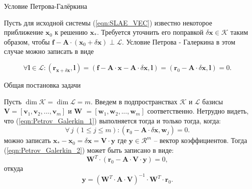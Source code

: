 \documentclass[10pt,xcolor=pst,aspectratio=169]{beamer}
\begin{document}
\begin{frame}{Условие Петрова-Галёркина}

	\transdissolve[duration=0.2]
	\justifying
	\large
	Пусть для исходной системы (\ref{eqn:SLAE_VEC}) известно некоторое приближение $\textbf{x}_{0}$ к решению $\textbf{x}_{\ast}$. Требуется уточнить его поправкой $\delta \textbf{x} \in \mathcal{K}$ таким образом, чтобы $\textbf{f} - \textbf{A} \cdot (\textbf{x}_{0} + \delta \textbf{x}) \perp \mathcal{L}$. Условие Петрова - Галеркина в этом случае можно записать в виде
	\begin{block}{}
		\begin{equation}
			\forall \textbf{l} \in \mathcal{L}: (\textbf{r}_{\textbf{x} + \delta \textbf{x}} , \textbf{l}) = (\textbf{f} - \textbf{A} \cdot \textbf{x} - \textbf{A} \cdot \delta \textbf{x} , \textbf{l}) = (\textbf{r}_{0} - \textbf{A} \cdot \delta \textbf{x} , \textbf{l}) = 0.
			\label{eqn:Petrov_Galerkin_1}
		\end{equation}
	\end{block}

\end{frame}

\begin{frame}{Общая постановка задачи}

	\transdissolve[duration=0.2]
	\justifying
	\large
	Пусть $\dim \mathcal{K} = \dim \mathcal{L} = m$. Введем в подпространствах $\mathcal{K}$ и $\mathcal{L}$ базисы $\textbf{V} = [\textbf{v}_1, \textbf{v}_2 , ..., \textbf{v}_m]$ и $\textbf{W } = [\textbf{w}_1, \textbf{w}_2, ..., \textbf{w}_m ]$ соответственно. Нетрудно видеть, что (\ref{eqn:Petrov_Galerkin_1}) выполняется тогда и только тогда, когда:
	\begin{equation}
		\forall \, j \, (1 \leq j \leq m) : (\textbf{r}_{0} - \textbf{A} \cdot \delta \textbf{x} , \textbf{w}_j) = 0.
		\label{eqn:Petrov_Galerkin_2}
	\end{equation}
	можно записать $\textbf{x}_{\ast} - \textbf{x}_{0} = \delta \textbf{x} = \textbf{V} \cdot \textbf{y}$ где $\textbf{y} \in \mathcal{R}^{m}$ -- вектор
коэффициентов. Тогда (\ref{eqn:Petrov_Galerkin_2}) может быть записано в виде:
	\[
		\textbf{W}^{T} \cdot (\textbf{r}_{0} - \textbf{A} \cdot \textbf{V} \cdot \textbf{y}) = 0,
	\]
	откуда
	\[
		\textbf{y} = \left( \textbf{W}^{T} \cdot \textbf{A} \cdot \textbf{V} \right)^{-1} \cdot \textbf{W}^{T} \cdot \textbf{r}_{0}.
	\]

\end{frame}
\end{document}
